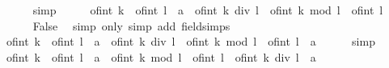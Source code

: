 \begin{isabellebody}
\ \ \ \ \isamarkupfalse%
\ simp\isanewline
\ \ \isamarkupfalse%
\ \isamarkupfalse%
\ {\isachardoublequoteopen}{\isacharparenleft}{\kern0pt}of{\isacharunderscore}{\kern0pt}int\ k\ {\isacharslash}{\kern0pt}\ of{\isacharunderscore}{\kern0pt}int\ l\ {\isacharcolon}{\kern0pt}{\isacharcolon}{\kern0pt}\ {\isacharprime}{\kern0pt}a{\isacharparenright}{\kern0pt}\ {\isacharequal}{\kern0pt}\ of{\isacharunderscore}{\kern0pt}int\ {\isacharparenleft}{\kern0pt}k\ div\ l{\isacharparenright}{\kern0pt}\ {\isacharplus}{\kern0pt}\ of{\isacharunderscore}{\kern0pt}int\ {\isacharparenleft}{\kern0pt}k\ mod\ l{\isacharparenright}{\kern0pt}\ {\isacharslash}{\kern0pt}\ of{\isacharunderscore}{\kern0pt}int\ l{\isachardoublequoteclose}\isanewline
\ \ \ \ \isamarkupfalse%
\ False\ \isamarkupfalse%
\ {\isacharparenleft}{\kern0pt}simp\ only{\isacharcolon}{\kern0pt}{\isacharparenright}{\kern0pt}\ {\isacharparenleft}{\kern0pt}simp\ add{\isacharcolon}{\kern0pt}\ field{\isacharunderscore}{\kern0pt}simps{\isacharparenright}{\kern0pt}\isanewline
\ \ \isamarkupfalse%
\ \isamarkupfalse%
\ {\isachardoublequoteopen}{\isasymlfloor}of{\isacharunderscore}{\kern0pt}int\ k\ {\isacharslash}{\kern0pt}\ of{\isacharunderscore}{\kern0pt}int\ l\ {\isacharcolon}{\kern0pt}{\isacharcolon}{\kern0pt}\ {\isacharprime}{\kern0pt}a{\isasymrfloor}\ {\isacharequal}{\kern0pt}\ {\isasymlfloor}of{\isacharunderscore}{\kern0pt}int\ {\isacharparenleft}{\kern0pt}k\ div\ l{\isacharparenright}{\kern0pt}\ {\isacharplus}{\kern0pt}\ of{\isacharunderscore}{\kern0pt}int\ {\isacharparenleft}{\kern0pt}k\ mod\ l{\isacharparenright}{\kern0pt}\ {\isacharslash}{\kern0pt}\ of{\isacharunderscore}{\kern0pt}int\ l\ {\isacharcolon}{\kern0pt}{\isacharcolon}{\kern0pt}\ {\isacharprime}{\kern0pt}a{\isasymrfloor}{\isachardoublequoteclose}\isanewline
\ \ \ \ \isamarkupfalse%
\ simp\isanewline
\ \ \isamarkupfalse%
\ \isamarkupfalse%
\ {\isachardoublequoteopen}{\isasymlfloor}of{\isacharunderscore}{\kern0pt}int\ k\ {\isacharslash}{\kern0pt}\ of{\isacharunderscore}{\kern0pt}int\ l\ {\isacharcolon}{\kern0pt}{\isacharcolon}{\kern0pt}\ {\isacharprime}{\kern0pt}a{\isasymrfloor}\ {\isacharequal}{\kern0pt}\ {\isasymlfloor}of{\isacharunderscore}{\kern0pt}int\ {\isacharparenleft}{\kern0pt}k\ mod\ l{\isacharparenright}{\kern0pt}\ {\isacharslash}{\kern0pt}\ of{\isacharunderscore}{\kern0pt}int\ l\ {\isacharplus}{\kern0pt}\ of{\isacharunderscore}{\kern0pt}int\ {\isacharparenleft}{\kern0pt}k\ div\ l{\isacharparenright}{\kern0pt}\ {\isacharcolon}{\kern0pt}{\isacharcolon}{\kern0pt}\ {\isacharprime}{\kern0pt}a{\isasymrfloor}{\isachardoublequoteclose}\isanewline

\end{isabellebody}
